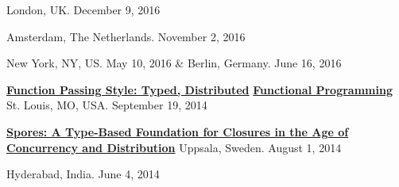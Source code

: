 \documentclass[9pt]{article}
\begin{document}
\vspace{-0.03in}
\newline{}
\linebreak\noindent London, UK. December 9, 2016
\bigskip


\vspace{-0.03in}
\newline{}\dates{}
\linebreak\noindent Amsterdam, The Netherlands. November 2, 2016
\bigskip

\linebreak\noindent New York, NY, US. May 10, 2016 \& Berlin, Germany. June 16, 2016 
\newline{}
\bigskip


\noindent\href{https://speakerdeck.com/heathermiller/function-passing-style-typed-distributed-functional-programming}{\bf Function Passing Style: Typed, Distributed} \vspace{-0.03in}
\linebreak\noindent\href{https://speakerdeck.com/heathermiller/function-passing-style-typed-distributed-functional-programming}{\bf Functional Programming}\dates{}
\linebreak\noindent St. Louis, MO, USA. September 19, 2014
\bigskip


\noindent\href{https://speakerdeck.com/heathermiller/spores-a-type-based-foundation-for-closures-in-the-age-of-concurrency-and-distribution}{\bf Spores: A Type-Based Foundation for Closures in the Age of} \vspace{-0.03in}
\linebreak\noindent\href{https://speakerdeck.com/heathermiller/spores-a-type-based-foundation-for-closures-in-the-age-of-concurrency-and-distribution}{\bf Concurrency and Distribution}\dates{}
\linebreak\noindent Uppsala, Sweden. August 1, 2014
\bigskip

 \vspace{-0.03in}
\linebreak{}\dates{}
\linebreak\noindent Hyderabad, India. June 4, 2014
\bigskip
\end{document}
